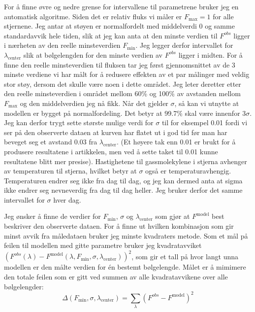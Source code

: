 \documentclass[reprint, english,notitlepage]{revtex4-1}  %
\begin{document}
For å finne øvre og nedre grense for intervallene til parametrene bruker jeg en automatisk
 algoritme. Siden det er relativ fluks vi måler er $F_{\text{max}} = 1$ for alle stjernene. Jeg antar at
 støyen er normalfordelt med middelverdi 0 og samme standardavvik hele tiden, slik at jeg kan
 anta at den minste verdien til $F^{obs}$ ligger i nærheten av den reelle minsteverdien
 $F_{\text{min}}$. Jeg legger derfor intervallet for $\lambda_{\text{center}}$ slik at bølgelengden for den
 minste verdien av $F^{obs}$ ligger i midten. For å finne den reelle minsteverdien til
 fluksen tar jeg først gjennomsnittet av de 3 minste verdiene vi har målt for å redusere effekten
 av et par målinger med veldig stor støy, dersom det skulle være noen i dette området. Jeg leter
 deretter etter den reelle minsteverdien i området mellom 60\% og 100\% av avstanden mellom
 $F_{\text{max}}$ og den middelverdien jeg nå fikk. Når det gjelder $\sigma$, så kan vi utnytte at
 modellen er bygget på normalfordeling. Det betyr at 99.7\% skal være innenfor $3 \sigma$. Jeg
 kan derfor trygt sette største mulige verdi for $\sigma$ til for eksempel 0.01 fordi vi ser på den observerte dataen at
 kurven har flatet ut i god tid før man har beveget seg et avstand 0.03 fra $\lambda_{\text{center}}$.
 (Et høyere tak enn 0.01 er brukt for å produsere resultatene i artikkelen, men ved å sette taket
 til 0.01 kunne resultatene blitt mer presise). Hastighetene til gassmolekylene i stjerna avhenger av temperaturen til stjerna, hvilket betyr at $\sigma$ også er temperaturavhengig. Temperaturen endrer seg ikke fra dag til dag, og jeg kan dermed anta at sigma ikke endrer seg nevneverdig fra dag til dag heller. Jeg bruker derfor det samme intervallet for $\sigma$ hver dag.

Jeg ønsker å finne de verdier for $F_{\text{min}}$, $\sigma$ og $\lambda_{\text{center}}$ som gjør at $F^{\text{model}}$ best beskriver den observerte dataen. For å finne ut hvilken kombinasjon som gir minst avvik fra måledataen bruker jeg minste
 kvadraters metode. Som et mål på feilen til modellen med gitte parametre bruker jeg
 kvadratavviket $(F^{obs} (\lambda) - F^{\text{model}} (\lambda, F_{\text{min}}, \sigma, \lambda_{\text{center}}))^2$,
 som gir et tall på hvor langt unna modellen er den målte verdien for én bestemt bølgelengde.
 Målet er å mimimere den totale feilen som er gitt ved summen av alle kvadratavvikene over alle
 bølgelengder:
 \begin{equation}
   \label{eq:error}
   \Delta (F_{\text{min}}, \sigma, \lambda_{\text{center}}) = \sum_{\lambda} (F^{obs} - F^{\text{model}})^2
 \end{equation}
\end{document}
